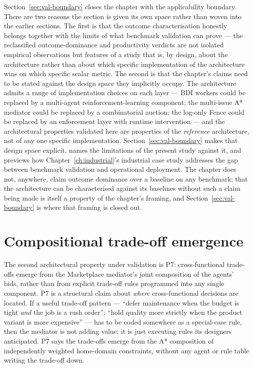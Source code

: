 Section~\ref{sec:val-boundary} closes the chapter with the
applicability boundary. There are two reasons the section is given
its own space rather than woven into the earlier sections. The first
is that the outcome characterisation honestly belongs together with
the limits of what benchmark validation can prove --- the
reclassified outcome-dominance and productivity verdicts are not
isolated empirical observations but features of a study that is, by
design, about the architecture rather than about which specific
implementation of the architecture wins on which specific scalar
metric. The second is that the chapter's claims
need to be stated against the design space they implicitly occupy.
The \NEXUS{} architecture admits a range of implementation choices on
each layer --- BDI workers could be replaced by a multi-agent
reinforcement-learning component; the multi-issue A* mediator could
be replaced by a combinatorial auction; the log-only Fence could be
replaced by an enforcement layer with runtime intervention --- and the
architectural properties validated here are properties of the
\emph{reference} architecture, not of any one specific implementation.
Section~\ref{sec:val-boundary} makes that design space explicit, names
the limitations of the present study against it, and previews how
Chapter~\ref{ch:industrial}'s industrial case study addresses the
gap between benchmark validation and operational deployment. The
chapter does not, anywhere, claim outcome dominance over a baseline
on any benchmark; that the architecture can be characterised against
its baselines without such a claim being made is itself a property
of the chapter's framing, and Section~\ref{sec:val-boundary} is where
that framing is closed out.


\section{Compositional trade-off emergence}
\label{sec:val-emergence}

The second architectural property under validation is P7:
cross-functional trade-offs emerge from the Marketplace mediator's
joint composition of the agents' bids, rather than from explicit
trade-off rules programmed into any single component. P7 is a
structural claim about \emph{where} cross-functional decisions are
located. If a useful trade-off pattern --- ``defer maintenance when
the budget is tight \emph{and} the job is a rush order''; ``hold
quality more strictly when the product variant is more expensive''
--- has to be coded somewhere as a special-case rule, then the
mediator is not adding value; it is just executing rules its
designers anticipated. P7 says the trade-offs emerge from the A*
composition of independently weighted home-domain constraints,
without any agent or rule table writing the trade-off down.

